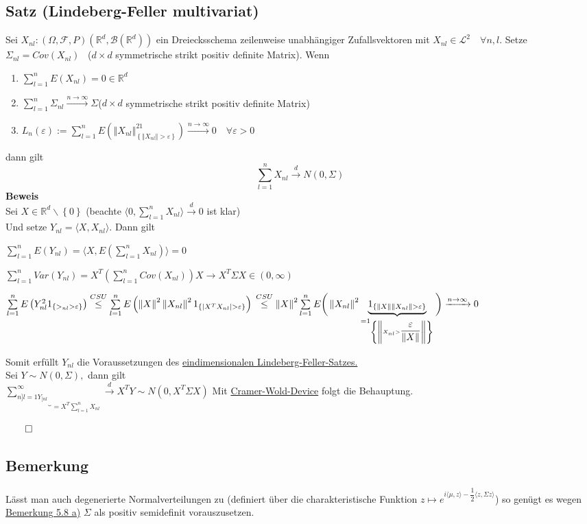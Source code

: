 \documentclass[german,10pt,oneside, fleqn, a4paper]{article}
\newcommand {\R}	{\mathbb{R}}
\newcommand{\ra}{\rightarrow}
\newcommand{\sm}[2][\infty]{\sum\limits_{#2}^{#1}}
\newcommand{\brc}[1]{\left(#1\right)}
\newcommand{\brac}[1]{\left\lbrace #1\right\rbrace}
\newcommand{\norm}[1]{\left\Vert #1 \right\Vert}
\newcommand{\QED}{\begin{flushright}$\qed$\end{flushright}}
\newcommand{\mc}[1]{\mathcal{#1}}
\newcommand{\lp}[1]{\mc{L}^{#1}}
\newcommand{\beweis}{\textbf{Beweis}\\}
\newcommand{\toinf}{\rightarrow\infty}
\newcommand{\1}[1]{1_{#1}}
\newcommand{\2}[1]{\1{\brac{#1}}}
\newcommand{\xr}[2][]{\xrightarrow[#1]{#2}}
\newcommand{\rbor}[1][d]{\brc{\R^{#1},\mc{B}\brc{\R^{#1}}}}
\newcommand{\raum}{\brc{\Omega,\mc{F},P}}
\begin{document}
\subsection{Satz (Lindeberg-Feller multivariat)}
\label{5.10}
Sei $X_{nl}:\raum\rbor$ ein Dreiecksschema zeilenweise unabhängiger Zufallsvektoren mit $X_{nl}\in\lp{2}\quad\forall n,l$. Setze $\Sigma_{nl}=Cov(X_{nl})$ \ ($d\times d$ symmetrische strikt positiv definite Matrix). Wenn\begin{enumerate}[label=(\alph*)]
\item $\sm[n]{l=1}E(X_{nl})=0\in\R^d$
\item $\sm[n]{l=1}\Sigma_{nl}\xr{n\toinf}\Sigma $($d\times d$ symmetrische strikt positiv definite Matrix)
\item $L_n(\varepsilon):=\sm[n]{l=1}E\brc{\norm{X_{nl}}^2\1{\brac{\norm{X_{nl}}>\varepsilon}}}\xr{n\toinf}0\quad\forall\varepsilon>0$
\end{enumerate}
dann gilt \[\sm[n]{l=1}X_{nl}\xr{d}N(0,\Sigma)\]
\beweis
Sei $X\in\R^d\backslash\brac{0}$ (beachte $\langle 0,\sm[n]{l=1}X_{nl}\rangle\xr{d}0$ ist klar)\\
Und setze $Y_{nl}=\langle X, X_{nl}\rangle$. Dann gilt\begin{list}{•}{}
\item $\sm[n]{l=1}E(Y_{nl})=\langle X,E\brc{\sm[n]{l=1}X_{nl}}\rangle=0$
\item  $\sm[n]{l=1}Var(Y_{nl})=X^T\brc{\sm[n]{l=1}Cov(X_{nl})}X\ra X^T\Sigma X\in(0,\infty)$
\item $\sm[n]{l=1}E\brc{Y_{nl}^2\2{>_{nl}>\varepsilon}}\overset{CSU}{\le}\sm[n]{l=1}E\brc{\norm{X}^2\norm{X_{nl}}^2\2{|X^TX_{nl}|>\varepsilon}}\\
\overset{CSU}{\le}\norm{X}^2\sm[n]{l=1}E\bigg(\norm{X_{nl}}^2\underbrace{\2{\norm{X}\norm{X_{nl}}>\varepsilon}}_{=\2{\norm{X_{nl}>\dfrac{\varepsilon}{\norm{X}}}}}\bigg)\xr{n\toinf}0$
\end{list}
Somit erfüllt $Y_{nl}$ die Voraussetzungen des  \hyperref[5.4]{eindimensionalen Lindeberg-Feller-Satzes.}\\
Sei $Y\sim N(0,\Sigma),$ dann gilt\\
$\underbrace{\sm{n]{l=1}Y_{[nl}}}_{=X^T\sm[n]{l=1}X_{nl}}\xr{d}X^TY\sim N(0,X^T\Sigma X)$
Mit \hyperref[4.13]{Cramer-Wold-Device} folgt die Behauptung.\QED
 
\subsection{Bemerkung}
\label{5.11}
Lässt man auch degenerierte Normalverteilungen zu (definiert über die charakteristische Funktion $z\mapsto e^{i\langle\mu,z\rangle-\dfrac{1}{2}\langle z,\Sigma z\rangle}$) so genügt es wegen \hyperref[5.8]{Bemerkung 5.8 a)} $\Sigma$ als positiv semidefinit vorauszusetzen.
\end{document}
